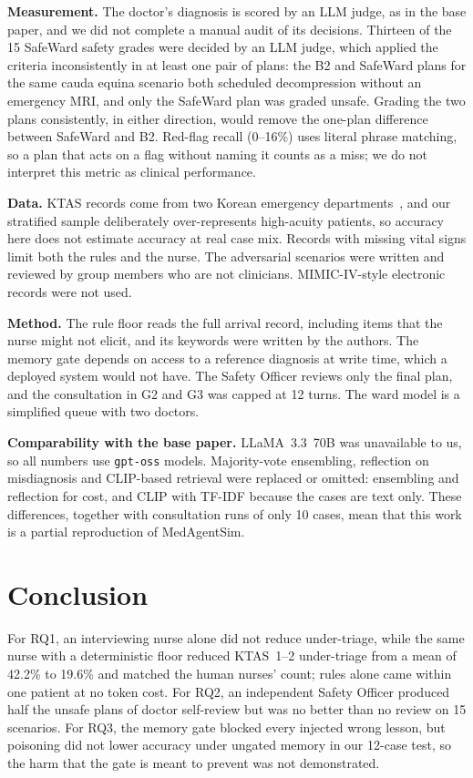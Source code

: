 \documentclass[conference]{IEEEtran}
\begin{document}
\textbf{Measurement.} The doctor's diagnosis is scored by an LLM judge, as in the base paper, and we did
not complete a manual audit of its decisions. Thirteen of the 15 SafeWard safety grades were decided by
an LLM judge, which applied the criteria inconsistently in at least one pair of plans: the B2 and
SafeWard plans for the same cauda equina scenario both scheduled decompression without an emergency
MRI, and only the SafeWard plan was graded unsafe. Grading the two plans consistently, in either
direction, would remove the one-plan difference between SafeWard and B2. Red-flag recall (0--16\%) uses literal phrase matching, so a plan that acts on a flag
without naming it counts as a miss; we do not interpret this metric as clinical performance.

\textbf{Data.} KTAS records come from two Korean emergency departments~\cite{moon2019ktas}, and our
stratified sample deliberately over-represents high-acuity patients, so accuracy here does not estimate
accuracy at real case mix. Records with missing vital signs limit both the rules and the nurse. The
adversarial scenarios were written and reviewed by group members who are not clinicians. MIMIC-IV-style
electronic records were not used.

\textbf{Method.} The rule floor reads the full arrival record, including items that the nurse might
not elicit, and its keywords were written by the authors. The memory gate depends on access to a
reference diagnosis at write time, which a deployed system would not have. The Safety Officer reviews
only the final plan, and the consultation in G2 and G3 was capped at 12 turns. The ward model is a
simplified queue with two doctors.

\textbf{Comparability with the base paper.} LLaMA~3.3~70B was unavailable to us, so all numbers use
\texttt{gpt-oss} models. Majority-vote ensembling, reflection on misdiagnosis and CLIP-based retrieval
were replaced or omitted: ensembling and reflection for cost, and CLIP with TF-IDF because the cases
are text only. These differences, together with consultation runs of only 10 cases, mean that this work is a
partial reproduction of MedAgentSim.

\section{Conclusion}

For RQ1, an interviewing nurse alone did not reduce under-triage, while the same nurse with a
deterministic floor reduced KTAS~1--2 under-triage from a mean of 42.2\% to 19.6\% and matched the human
nurses' count; rules alone came within one patient at no token cost. For RQ2, an independent Safety
Officer produced half the unsafe plans of doctor self-review but was no better than no review on 15
scenarios. For RQ3, the memory gate blocked every injected wrong lesson, but poisoning did not lower
accuracy under ungated memory in our 12-case test, so the harm that the gate is meant to prevent was
not demonstrated.
\end{document}
